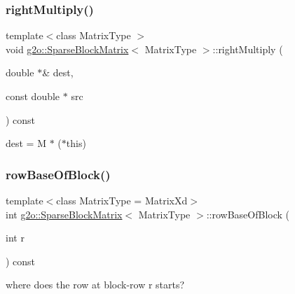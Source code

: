 \subsubsection{\texorpdfstring{right\+Multiply()}{rightMultiply()}}
{\footnotesize\ttfamily template$<$class Matrix\+Type $>$ \\
void \mbox{\hyperlink{classg2o_1_1_sparse_block_matrix}{g2o\+::\+Sparse\+Block\+Matrix}}$<$ Matrix\+Type $>$\+::right\+Multiply (\begin{DoxyParamCaption}\item[{double $\ast$\&}]{dest,  }\item[{const double $\ast$}]{src }\end{DoxyParamCaption}) const}



dest = M $\ast$ ($\ast$this) 

\mbox{\label{classg2o_1_1_sparse_block_matrix_af718590d044a1b44e4079136c29efcd1}} 
\subsubsection{\texorpdfstring{row\+Base\+Of\+Block()}{rowBaseOfBlock()}}
{\footnotesize\ttfamily template$<$class Matrix\+Type = Matrix\+Xd$>$ \\
int \mbox{\hyperlink{classg2o_1_1_sparse_block_matrix}{g2o\+::\+Sparse\+Block\+Matrix}}$<$ Matrix\+Type $>$\+::row\+Base\+Of\+Block (\begin{DoxyParamCaption}\item[{int}]{r }\end{DoxyParamCaption}) const\hspace{0.3cm}{\ttfamily [inline]}}



where does the row at block-\/row r starts? 

\mbox{\label{classg2o_1_1_sparse_block_matrix_a4fff500693b46e4f62a2f828934d198c}} 
